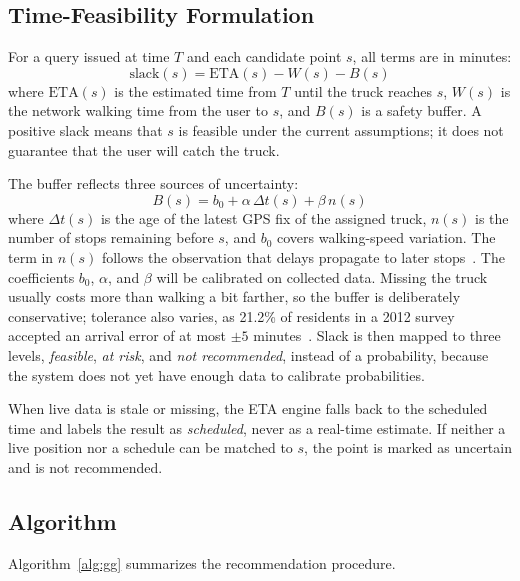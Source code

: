 \subsection{Time-Feasibility Formulation}
For a query issued at time $T$ and each candidate point $s$, all terms
are in minutes:
\begin{equation}
\mathrm{slack}(s) = \mathrm{ETA}(s) - W(s) - B(s)
\label{eq:slack}
\end{equation}
where $\mathrm{ETA}(s)$ is the estimated time from $T$ until the truck
reaches $s$, $W(s)$ is the network walking time from the user to $s$, and
$B(s)$ is a safety buffer. A positive slack means that $s$ is feasible
under the current assumptions; it does not guarantee that the user will
catch the truck.

The buffer reflects three sources of uncertainty:
\begin{equation}
B(s) = b_0 + \alpha\,\Delta t(s) + \beta\,n(s)
\label{eq:buffer}
\end{equation}
where $\Delta t(s)$ is the age of the latest GPS fix of the assigned
truck, $n(s)$ is the number of stops remaining before $s$, and $b_0$
covers walking-speed variation. The term in $n(s)$ follows the observation
that delays propagate to later stops~\cite{tcepb2022report,chen2019travel}.
The coefficients $b_0$, $\alpha$, and $\beta$ will be calibrated on
collected data. Missing the truck usually costs more than walking a bit
farther, so the buffer is deliberately conservative; tolerance also
varies, as 21.2\% of residents in a 2012 survey accepted an arrival error
of at most $\pm5$ minutes~\cite{tc2012survey}. Slack is then mapped
to three levels, \emph{feasible}, \emph{at risk}, and \emph{not
recommended}, instead of a probability, because the system does not yet
have enough data to calibrate probabilities.

When live data is stale or missing, the ETA engine falls back to the
scheduled time and labels the result as \emph{scheduled}, never as a
real-time estimate. If neither a live position nor a schedule can be
matched to $s$, the point is marked as uncertain and is not recommended.

\subsection{Algorithm}
Algorithm~\ref{alg:gg} summarizes the recommendation procedure.

